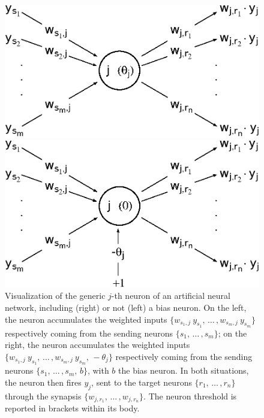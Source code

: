 \documentclass[longtitle]{elsarticle}
\numberwithin{equation}{section}
\theoremstyle{theorem}
\theoremstyle{definition}
\theoremstyle{remark}
\theoremstyle{proposition}
\numberwithin{figure}{section}
\begin{document}
		\begin{figure}[t]
			\begin{minipage}{0.49\textwidth}
				\center
				\vspace*{-0.35cm}
				\includegraphics[scale = 0.55]{neural_model_ter.eps}
			\end{minipage}
			\begin{minipage}{0.49\textwidth}
				\center
				\includegraphics[scale = 0.55]{neural_model_bias.eps}
			\end{minipage}
		
			\caption{Visualization of the generic $j$-th neuron of an artificial neural network, including (right) or not (left) a bias neuron. On the left, the neuron accumulates the weighted inputs $\big\lbrace w_{s_1,j} ~ y_{s_1}, \, \ldots \, , w_{s_m,j} ~ y_{s_m} \big\rbrace$ respectively coming from the sending neurons $\big\lbrace s_1, \, \ldots \, , s_m \big\rbrace$; on the right, the neuron accumulates the weighted inputs $\big\lbrace w_{s_1,j} ~ y_{s_1}, \, \ldots \, , w_{s_m,j} ~ y_{s_m}, \, -\theta_j \big\rbrace$ respectively coming from the sending neurons $\big\lbrace s_1, \, \ldots \, , s_m, \, b \big\rbrace$, with $b$ the bias neuron. In both situations, the neuron then fires $y_j$, sent to the target neurons $\big\lbrace r_1, \, \ldots \, , r_n \big\rbrace$ through the synapsis $\big\lbrace w_{j,r_1}, \, \ldots \, , w_{j,r_n} \big\rbrace$. The neuron threshold is reported in brackets within its body.} 
			\label{fig:neural-model}
		\end{figure}
		
\end{document}
